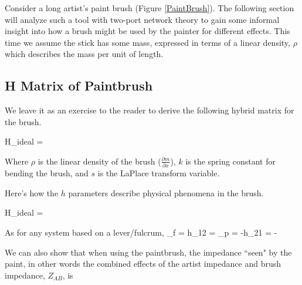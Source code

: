 Consider a long artist's paint brush (Figure \ref{PaintBrush}).  The following section will analyze such a tool with two-port network theory to gain some informal insight into how a brush might be used by the painter for different effects. This time we assume the stick has some mass, expressed in terms of a linear density, $\rho$ which describes the mass per unit of length.



\subsection{H Matrix of Paintbrush}

We leave it as an exercise to the reader to derive the following hybrid matrix for the brush.

\bq\label{HBrush}
H_{ideal}  = 
\eq

Where $\rho$  is the linear density of the brush ($\frac{\partial m}{\partial x}$),
$k$ is the spring constant for bending the brush, and $s$ is the LaPlace transform variable.


Here's how the $h$ parameters describe physical phenomena in the brush.

\bq\label{HBrush2}
H_{ideal}  = 
\eq

As for any system based on a lever/fulcrum,
\bq
\lambda_f =  h_{12} =  \qquad
\lambda_p = -h_{21} = -
\eq

We can also show that when using the paintbrush, the impedance ``seen" by the paint, in other words the combined effects of the artist impedance and brush impedance, $Z_{AB}$, is

